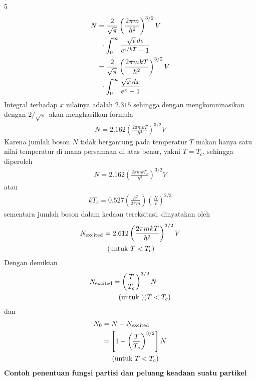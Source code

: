 \documentclass[a4paper  , 6 pt]{article}
\begin{document}
\begin{tiny}
\begin{multicols} {5}
\begin{align}
N &= \frac{2}{\sqrt{\pi}} \left(\frac{2 \pi m}{h^2}\right)^{3/2} V \nonumber \\
& \hspace{0.2 cm } \cdot \int_{0}^{\infty} \frac{\sqrt{\epsilon} \, d \epsilon}{e^{\epsilon/kT} -1} \nonumber \\
& = \frac{2}{\sqrt{\pi}} \left( \frac{2 \pi mk T}{h^2}\right)^{3/2} V \nonumber \\ & \hspace{0.2 cm} \cdot \int_{0}^{\infty} \frac{\sqrt{x} \, dx}{e^x - 1}
\end{align}
Integral terhadap $x$ nilainya adalah $2.315$ sehingga dengan mengkomninasikan dengan $2/ \sqrt{\pi}$ akan menghasilkan formula 
\begin{align}
N = 2.162 \left( \frac{2 \pi mkT}{h^2}\right)^{3/2} V 
\end{align}
Karena jumlah boson $N$ tidak bergantung pada temperatur $T$ makan hanya satu nilai temperatur di mana persamaan di atas benar, yakni $T = T_c $, sehingga diperoleh
\begin{align}
N = 2.162 \left( \frac{2 \pi mkT_c}{h^2}\right)^{3/2} V 
\end{align}
atau 
\begin{align}
kT_c = 0.527 \left( \frac{h^2}{2 \pi m}\right) \left( \frac{N}{V}\right)^{2/3}
\end{align}
sementara jumlah boson dalam kedaan tereksitasi, dinyatakan oleh
\begin{align}
N_\mathrm{excited} &= 2.612 \left( \frac{2 \pi m kT}{h^2}\right)^{3/2} V \nonumber \\
& \hspace{0.2 cm } (\text{untuk } T < T_c )
\end{align}
Dengan demikian 
\begin{align}
N_\mathrm{excited} &  = \left( \frac{T}{T_c }\right)^{3/2} N  \nonumber \\
& \hspace{0.3 cm } (\text{untuk }) (T < T_c)
\end{align}
dan 
\begin{align}
N_0 &= N - N_\mathrm{excited} \nonumber \\
& = \left [  1 - \left( \frac{T}{T_c }\right)^{3/2} \right ] N  \nonumber \\
& \hspace{ 0.5 cm } (\text{untuk } T < T_c)
\end{align}
\textbf{Contoh penentuan fungsi partisi dan peluang keadaan suatu partikel} \newline 

\end{multicols}
\end{tiny}
\end{document}
